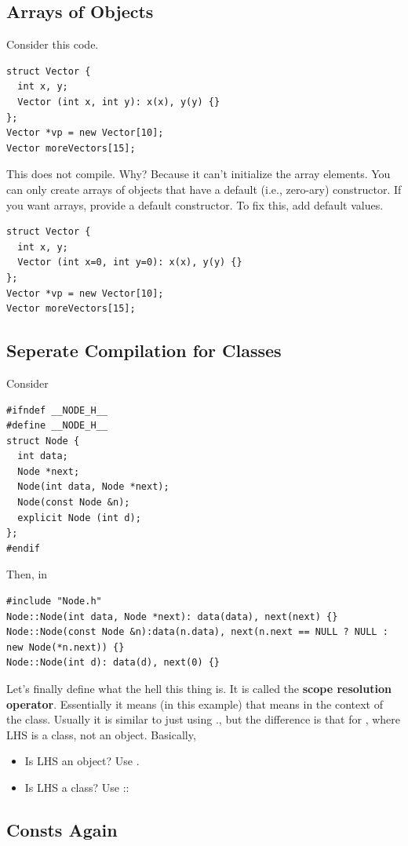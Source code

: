 \documentclass[english, 11pt]{article}
\begin{document}
\subsection{Arrays of Objects}
Consider this code.
\begin{lstlisting}
struct Vector {
  int x, y;
  Vector (int x, int y): x(x), y(y) {}
};
Vector *vp = new Vector[10];
Vector moreVectors[15];
\end{lstlisting}
This does not compile. Why? Because it can't initialize the array elements. You can only create arrays of objects that have a default (i.e., zero-ary) constructor. If you want arrays, provide a default constructor. To fix this, add default values.
\begin{lstlisting}
struct Vector {
  int x, y;
  Vector (int x=0, int y=0): x(x), y(y) {}
};
Vector *vp = new Vector[10];
Vector moreVectors[15];
\end{lstlisting}

\subsection{Seperate Compilation for Classes}

Consider \textbf{}
\begin{lstlisting}
#ifndef __NODE_H__
#define __NODE_H__
struct Node {
  int data;
  Node *next;
  Node(int data, Node *next);
  Node(const Node &n);
  explicit Node (int d);
};
#endif
\end{lstlisting}
Then, in \textbf{}
\begin{lstlisting}
#include "Node.h"
Node::Node(int data, Node *next): data(data), next(next) {}
Node::Node(const Node &n):data(n.data), next(n.next == NULL ? NULL : new Node(*n.next)) {}
Node::Node(int d): data(d), next(0) {}
\end{lstlisting}
Let's finally define what the hell this \tc{::} thing is. It is called the \textbf{scope resolution operator}. Essentially it means (in this example) that  means  in the context of the  class. Usually it is similar to just using ., but the difference is that for \tc{::}, where LHS is a class, not an object. Basically,
\begin{itemize}
  \item Is LHS an object? Use .
  \item Is LHS a class? Use ::
\end{itemize}

\subsection{Consts Again}
\end{document}
